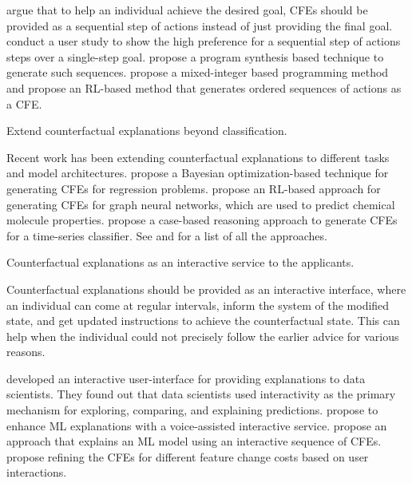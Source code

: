 \progress
\citet{naumann2021consequenceaware} argue that to help an individual achieve the desired goal, CFEs should be provided as a sequential step of actions instead of just providing the final goal. \citet{sequential-CFE} conduct a user study to show the high preference for a sequential step of actions steps over a single-step goal. 
\citet{ramakrishnan_synthesizing_2019} propose a program synthesis based technique to generate such sequences. 
\citet{Ordered-CFE-Kanamori} propose a mixed-integer based programming method and \citet{verma2021amortized} propose an RL-based method that generates ordered sequences of actions as a CFE. 


\begin{challenge}
Extend counterfactual explanations beyond classification.
\end{challenge}

\progress
Recent work has been extending counterfactual explanations to different tasks and model architectures.
\citet{cf-regression} propose a Bayesian optimization-based technique for generating CFEs for regression problems. 
\citet{CF-GNN1} propose an RL-based approach for generating CFEs for graph neural networks, which are used to predict chemical molecule properties. 
\citet{cf-timeseries1} propose a case-based reasoning approach to generate CFEs for a time-series classifier. 
See  and  for a list of all the approaches. 


\begin{challenge}\label{ch:interactive}
Counterfactual explanations as an interactive service to the applicants. 
\end{challenge}
Counterfactual explanations should be provided as an interactive interface, where an individual can come at regular intervals, inform the system of the modified state, and get updated instructions to achieve the counterfactual state. 
This can help when the individual could not precisely follow the earlier advice for various reasons. 

\progress
\citet{GAMUT} developed an interactive user-interface for providing explanations to data scientists. They found out that data scientists used interactivity as the primary mechanism for exploring, comparing, and explaining predictions.
\citet{glass-box-voice-assistant} propose to enhance ML explanations with a voice-assisted interactive service. 
\citet{akula-cfe-CX-ToM-images-interactivity} propose an approach that explains an ML model using an interactive sequence of CFEs. 
\citet{skyline-cfe-interactive} propose refining the CFEs for different feature change costs based on user interactions. 

